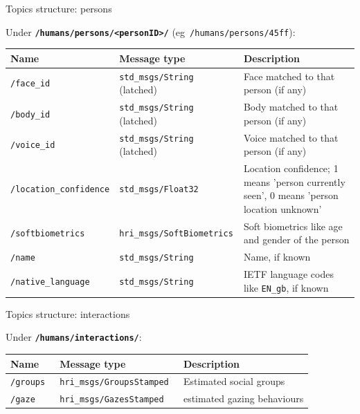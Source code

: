 \documentclass[xcolor=table]{beamer}
\begin{document}
\begin{frame}{Topics structure: persons}

    Under \textbf{\texttt{/humans/persons/<personID>/}} (eg~\texttt{/humans/persons/45ff}):

    \scriptsize
    \begin{tabular}{@{}llp{4cm}@{}}
        \toprule
        \textbf{Name} & \textbf{Message type}         & \textbf{Description}                                                \\ \midrule
        \texttt{/face\_id            } & \texttt{std\_msgs/String} (latched) & Face matched to that person (if any)                                                    \\
        \texttt{/body\_id            } & \texttt{std\_msgs/String} (latched) & Body matched to that person (if any)                                                    \\
        \texttt{/voice\_id           } & \texttt{std\_msgs/String} (latched) & Voice matched to that person (if any)                                                   \\
        \texttt{/location\_confidence} & \texttt{std\_msgs/Float32        }  & Location confidence; 1 means 'person currently seen', 0 means 'person location unknown' \\
        \texttt{/softbiometrics      } & \texttt{hri\_msgs/SoftBiometrics }  & Soft biometrics like age and gender of the person                                       \\
        \texttt{/name                } & \texttt{std\_msgs/String         }  & Name, if known                                                                          \\
        \texttt{/native\_language    } & \texttt{std\_msgs/String         }  & IETF language codes like \texttt{EN\_gb}, if known    \\
\bottomrule
\end{tabular}
    
\end{frame}

\begin{frame}{Topics structure: interactions}

    Under \textbf{\texttt{/humans/interactions/}}:

    \scriptsize
    \begin{tabular}{@{}llp{4cm}@{}}
        \toprule
        \textbf{Name} & \textbf{Message type}         & \textbf{Description}                                                \\ \midrule
        \texttt{/groups                } & \texttt{hri\_msgs/GroupsStamped         }  & Estimated social groups                                                                          \\
        \texttt{/gaze    } & \texttt{hri\_msgs/GazesStamped         }  & estimated gazing behaviours    \\
\bottomrule
\end{tabular}
    
\end{frame}
\end{document}
